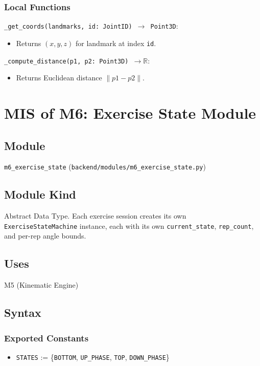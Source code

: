 \documentclass[12pt, titlepage]{article}
\begin{document}
\subsubsection{Local Functions}

\noindent \texttt{\_get\_coords(landmarks, id: JointID) $\rightarrow$ Point3D}:
\begin{itemize}
  \item Returns $(x, y, z)$ for landmark at index \texttt{id}.
\end{itemize}

\noindent \texttt{\_compute\_distance(p1, p2: Point3D) $\rightarrow \mathbb{R}$}:
\begin{itemize}
  \item Returns Euclidean distance $\|p1 - p2\|$.
\end{itemize}

\newpage

\section{MIS of M6: Exercise State Module} \label{M6}

\subsection{Module}
\texttt{m6\_exercise\_state} (\texttt{backend/modules/m6\_exercise\_state.py})

\subsection{Module Kind}
Abstract Data Type. Each exercise session creates its own
\texttt{ExerciseStateMachine} instance, each with its own
\texttt{current\_state}, \texttt{rep\_count}, and per-rep angle bounds.

\subsection{Uses}
M5 (Kinematic Engine)

\subsection{Syntax}

\subsubsection{Exported Constants}
\begin{itemize}
  \item \texttt{STATES} := \{\texttt{BOTTOM}, \texttt{UP\_PHASE}, \texttt{TOP}, \texttt{DOWN\_PHASE}\}
\end{itemize}
\end{document}
